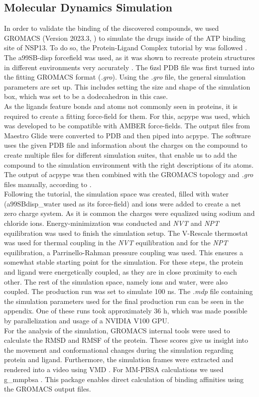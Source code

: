 \documentclass[11pt, letterpaper, titlepage]{article}
\renewcommand{\cite}{\parencite}
\begin{document}
\subsection{Molecular Dynamics Simulation}
In order to validate the binding of the discovered compounds, we used GROMACS (Version 2023.3, \textcite{packageGROMACS}) to simulate the drugs inside of the ATP binding site of NSP13. To do so, the Protein-Ligand Complex tutorial by  was followed \cite{Lemkul2018}. The a99SB-disp forcefield was used, as it was shown to recreate protein structures in different environments very accurately \cite{Forcefield}. The 6zsl PDB file was first turned into the fitting GROMACS format (\textit{.gro}). Using the \textit{.gro} file, the general simulation parameters are set up. This includes setting the size and shape of the simulation box, which was set to be a dodecahedron in this case. \\ 
As the ligands feature bonds and atoms not commonly seen in proteins, it is required to create a fitting force-field for them. For this, acpype \cite{acpype} was used, which was developed to be compatible with AMBER force-fields. The output files from Maestro Glide were converted to PDB and then piped into acpype. The software uses the given PDB file and information about the charges on the compound to create multiple files for different simulation suites, that enable us to add the compound to the simulation environment with the right descriptions of its atoms.  The output of acpype was then combined with the GROMACS topology and \textit{.gro} files manually, according to . \\
Following the tutorial, the simulation space was created, filled with water (a99SBdisp\_water used as its force-field) and ions were added to create a net zero charge system. As it is common the charges were equalized using sodium and chloride ions. Energy-minimization was conducted and \textit{NVT} and \textit{NPT} equilibration was used to finish the simulation setup. The V-Rescale thermostat was used for thermal coupling in the \textit{NVT} equilibration and for the \textit{NPT} equilibration, a Parrinello-Rahman pressure coupling was used. This ensures a somewhat stable starting point for the simulation. For these steps, the protein and ligand were energetically coupled, as they are in close proximity to each other. The rest of the simulation space, namely ions and water, were also coupled. The production run was set to simulate 100 ns. The \textit{.mdp} file containing the simulation parameters used for the final production run can be seen in the appendix. One of these runs took approximately  36 h, which was made possible by parallelization and usage of a NVIDIA V100 GPU. \\ 
For the analysis of the simulation, GROMACS internal tools were used to calculate the RMSD and RMSF of the protein. These scores give us insight into the movement and conformational changes during the simulation regarding protein and ligand. Furthermore, the simulation frames were extracted and rendered into a video using VMD \cite{VMD}. For MM-PBSA calculations we used g\_mmpbsa \cite{MMPBSA1, MMPBSA2}. This package enables direct calculation of binding affinities using the GROMACS output files.
\end{document}
